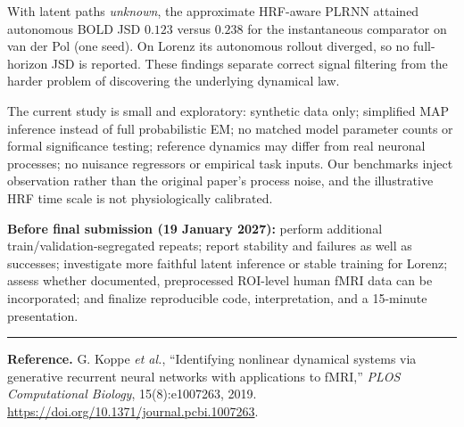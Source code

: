 \documentclass[9.5pt,a4paper]{article}
\newcommand{\subhead}[1]{\vspace{5pt}{\color{ink}\bfseries\large #1}\vspace{1pt}\par}
\newcommand{\smhead}[1]{{\color{accent}\bfseries #1}}
\begin{document}
With latent paths \emph{unknown}, the approximate HRF-aware PLRNN attained autonomous BOLD JSD $0.123$ versus $0.238$ for the instantaneous comparator on van der Pol (one seed). On Lorenz its autonomous rollout diverged, so no full-horizon JSD is reported. These findings separate correct signal filtering from the harder problem of discovering the underlying dynamical law.

\subhead{6. Limitations and next steps}
The current study is small and exploratory: synthetic data only; simplified MAP inference instead of full probabilistic EM; no matched model parameter counts or formal significance testing; reference dynamics may differ from real neuronal processes; no nuisance regressors or empirical task inputs. Our benchmarks inject observation rather than the original paper's process noise, and the illustrative HRF time scale is not physiologically calibrated.

\smhead{Before final submission (19 January 2027):} perform additional train/validation-segregated repeats; report stability and failures as well as successes; investigate more faithful latent inference or stable training for Lorenz; assess whether documented, preprocessed ROI-level human fMRI data can be incorporated; and finalize reproducible code, interpretation, and a 15-minute presentation.

\vspace{1pt}\hrule\vspace{2pt}
{\footnotesize \textbf{Reference.} G. Koppe \emph{et al.}, ``Identifying nonlinear dynamical systems via generative recurrent neural networks with applications to fMRI,'' \emph{PLOS Computational Biology}, 15(8):e1007263, 2019. \url{https://doi.org/10.1371/journal.pcbi.1007263}.}
\end{document}
